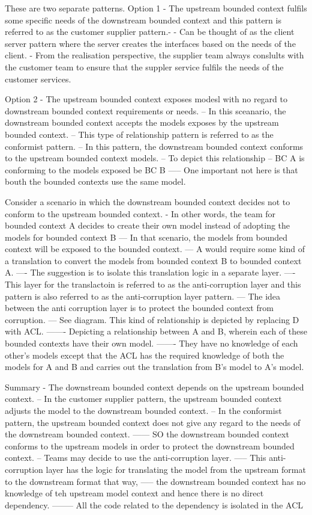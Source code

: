 These are two separate patterns.
Option 1 - The upstream bounded context fulfils some specific needs of the downstream bounded context and this pattern is referred to as the customer supplier pattern.-
- Can be thought of as the client server pattern where the server creates the interfaces based on the needs of the client.
- From the realisation perspective, the supplier team always conslults with the customer team to ensure that the suppler service fulfils the needs of the customer services.

Option 2 - The upstream bounded context exposes modesl with no regard to downstream bounded context requirements or needs.
-- In this sceanario, the downstream bounded context accepts the models exposes by the upstream bounded context.
-- This type of relationship pattern is referred to as the conformist pattern.
-- In this pattern, the downstream bounded context conforms to the upstream bounded context models.
-- To depict this relationship %
-- BC A is conforming to the models exposed be BC B
----- One important not here is that bouth the bounded contexts use the same model.


Consider a scenario in which the downstream bounded context decides not to conform to the upstream bounded context.
- In other words, the team for bounded context A decides to create their own model instead of adopting the models for bounded context B
--- In that scenario, the models from bounded context will be exposed to the bounded context.
--- A would require some kind of a translation to convert the models from bounded context B to bounded context A.
---- The suggestion is to isolate this translation logic in a separate layer.
---- This layer for the translactoin is referred to as the anti-corruption layer and this pattern is also referred to as the anti-corruption layer pattern.
--- The idea between the anti corruption layer is to protect the bounded context from corruption.
--- See diagram. This kind of relationship is depicted by replacing D with ACL.
------- Depicting a relationship between A and B, wherein each of these bounded contexts have their own model.
------- They have no knowledge of each other's models except that the ACL has the required knowledge of both the models for A and B and carries out the translation from B's model to A's model.

Summary
- The downstream bounded context depends on the upstream bounded context.
-- In the customer supplier pattern, the upstream bounded context adjusts the model to the downstream bounded context.
-- In the conformist pattern, the upstream bounded context does not give any regard to the needs of the downstream bounded context.
------ SO the downstream bounded context conforms to the upstream models in order to protect the downstream bounded context.
-- Teams may decide to use the anti-corruption layer.
----- This anti-corruption layer has the logic for translating the model from the upstream format to the downstream format that way,
----- the downstream bounded context has no knowledge of teh upstream model context and hence there is no direct dependency.
-------- All the code related to the dependency is isolated in the ACL


